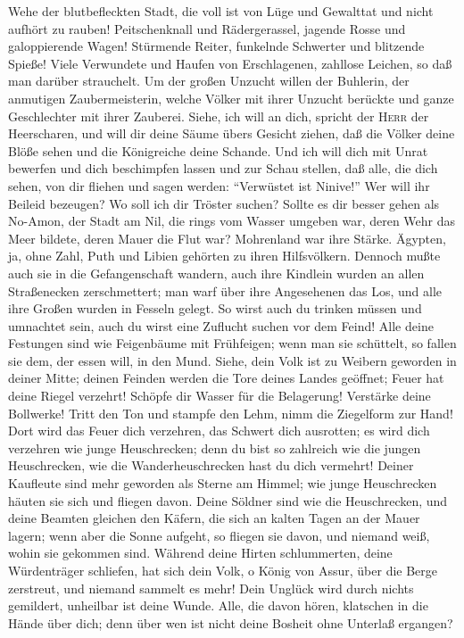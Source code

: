  Wehe der blutbefleckten Stadt, die voll ist von Lüge und
Gewalttat und nicht aufhört zu rauben!  Peitschenknall und
Rädergerassel, jagende Rosse und galoppierende Wagen! 
Stürmende Reiter, funkelnde Schwerter und blitzende Spieße! Viele
Verwundete und Haufen von Erschlagenen, zahllose Leichen, so daß man
darüber strauchelt.  Um der großen Unzucht willen der
Buhlerin, der anmutigen Zaubermeisterin, welche Völker mit ihrer Unzucht
berückte und ganze Geschlechter mit ihrer Zauberei. 
Siehe, ich will an dich, spricht der \textsc{Herr} der Heerscharen, und
will dir deine Säume übers Gesicht ziehen, daß die Völker deine Blöße
sehen und die Königreiche deine Schande.  Und ich will
dich mit Unrat bewerfen und dich beschimpfen lassen und zur Schau
stellen,  daß alle, die dich sehen, von dir fliehen und
sagen werden: ``Verwüstet ist Ninive!'' Wer will ihr Beileid bezeugen?
Wo soll ich dir Tröster suchen?  Sollte es dir besser
gehen als No-Amon, der Stadt am Nil, die rings vom Wasser umgeben war,
deren Wehr das Meer bildete, deren Mauer die Flut war? 
Mohrenland war ihre Stärke. Ägypten, ja, ohne Zahl, Puth und Libien
gehörten zu ihren Hilfsvölkern.  Dennoch mußte auch sie
in die Gefangenschaft wandern, auch ihre Kindlein wurden an allen
Straßenecken zerschmettert; man warf über ihre Angesehenen das Los, und
alle ihre Großen wurden in Fesseln gelegt.  So wirst auch
du trinken müssen und umnachtet sein, auch du wirst eine Zuflucht suchen
vor dem Feind!  Alle deine Festungen sind wie Feigenbäume
mit Frühfeigen; wenn man sie schüttelt, so fallen sie dem, der essen
will, in den Mund.  Siehe, dein Volk ist zu Weibern
geworden in deiner Mitte; deinen Feinden werden die Tore deines Landes
geöffnet; Feuer hat deine Riegel verzehrt!  Schöpfe dir
Wasser für die Belagerung! Verstärke deine Bollwerke! Tritt den Ton und
stampfe den Lehm, nimm die Ziegelform zur Hand!  Dort
wird das Feuer dich verzehren, das Schwert dich ausrotten; es wird dich
verzehren wie junge Heuschrecken; denn du bist so zahlreich wie die
jungen Heuschrecken, wie die Wanderheuschrecken hast du dich vermehrt!
 Deiner Kaufleute sind mehr geworden als Sterne am
Himmel; wie junge Heuschrecken häuten sie sich und fliegen davon.
 Deine Söldner sind wie die Heuschrecken, und deine
Beamten gleichen den Käfern, die sich an kalten Tagen an der Mauer
lagern; wenn aber die Sonne aufgeht, so fliegen sie davon, und niemand
weiß, wohin sie gekommen sind.  Während deine Hirten
schlummerten, deine Würdenträger schliefen, hat sich dein Volk, o König
von Assur, über die Berge zerstreut, und niemand sammelt es mehr!
 Dein Unglück wird durch nichts gemildert, unheilbar ist
deine Wunde. Alle, die davon hören, klatschen in die Hände über dich;
denn über wen ist nicht deine Bosheit ohne Unterlaß ergangen?
